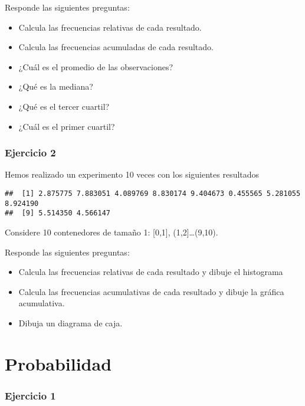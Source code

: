 \documentclass[
]{book}
\providecommand{\tightlist}{%
  \setlength{\itemsep}{0pt}\setlength{\parskip}{0pt}}
\begin{document}
Responde las siguientes preguntas:

\begin{itemize}
\tightlist
\item
  Calcula las frecuencias relativas de cada resultado.
\item
  Calcula las frecuencias acumuladas de cada resultado.
\item
  ¿Cuál es el promedio de las observaciones?
\item
  ¿Qué es la mediana?
\item
  ¿Qué es el tercer cuartil?
\item
  ¿Cuál es el primer cuartil?
\end{itemize}

\hypertarget{ejercicio-2}{%
\subsubsection{Ejercicio 2}\label{ejercicio-2}}

Hemos realizado un experimento 10 veces con los siguientes resultados

\begin{verbatim}
##  [1] 2.875775 7.883051 4.089769 8.830174 9.404673 0.455565 5.281055 8.924190
##  [9] 5.514350 4.566147
\end{verbatim}

Considere 10 contenedores de tamaño 1: {[}0,1{]}, (1,2{]}\ldots(9,10).

Responde las siguientes preguntas:

\begin{itemize}
\item
  Calcula las frecuencias relativas de cada resultado y dibuje el histograma
\item
  Calcula las frecuencias acumulativas de cada resultado y dibuje la gráfica acumulativa.
\item
  Dibuja un diagrama de caja.
\end{itemize}

\hypertarget{probabilidad-3}{%
\section{Probabilidad}\label{probabilidad-3}}

\hypertarget{ejercicio-1-1}{%
\subsubsection{Ejercicio 1}\label{ejercicio-1-1}}
\end{document}

